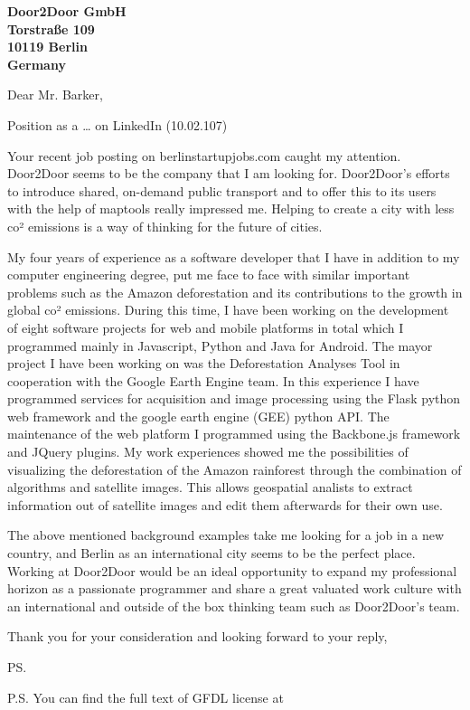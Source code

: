 \documentclass[a4paper]{joaosoares-letter}
\begin{document}
\longindentation=0pt

\begin{letter}{\bfseries Door2Door GmbH\\Torstraße 109\\10119 Berlin\\Germany}


\date{Belém, \today}

\opening{Dear Mr. Barker,}{Position as a … on LinkedIn (10.02.107)}

	Your recent job posting on berlinstartupjobs.com caught my attention. Door2Door seems to be the company that I am looking for. Door2Door’s efforts to introduce shared, on-demand public transport and to offer this to its users with the help of maptools really impressed me. Helping to create a city with less co² emissions is a way of thinking for the future of cities. 

	My four years of experience as a software developer that I have in addition to my computer engineering degree, put me face to face with similar important problems such as the Amazon deforestation and its contributions to the growth in global co² emissions. During this time, I have been working on the development of eight software projects for web and mobile platforms in total which I programmed mainly in Javascript, Python and Java for Android. The mayor project I have been working on was the Deforestation Analyses Tool in cooperation with the Google Earth Engine team. In this experience I have programmed services for acquisition and image processing using the Flask python web framework and the google earth engine (GEE) python API. The maintenance of the web platform I programmed using the Backbone.js framework and JQuery plugins. My work experiences showed me the possibilities of visualizing the deforestation of the Amazon rainforest through the combination of algorithms and satellite images. This allows geospatial analists to extract information out of satellite images and edit them afterwards for their own use.

The above mentioned background examples take me looking for a job in a new country, and Berlin as an international city seems to be the perfect place. Working at Door2Door would be an ideal opportunity to expand my professional horizon as a passionate programmer and share a great valuated work culture with an international and outside of the box thinking team such as Door2Door’s team. 

\closing{Thank you for your consideration and looking forward to your reply,}
\vspace{20pt}
\ps

P.S. You can find the full text of GFDL license at
\vspace{\fill}

\end{letter}
\end{document}
